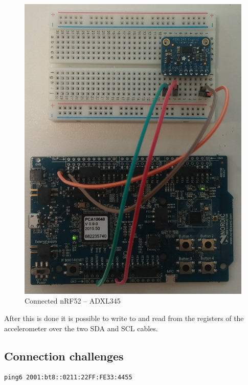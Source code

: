\begin{figure}[ht]
    \centering
    \includegraphics[scale=0.35]{nrf-adxl.png}    \caption{Connected nRF52 -- ADXL345}
    \label{fig:nrf-adxl345}
\end{figure}

After this is done it is possible to write to and read from the registers of the accelerometer over the two SDA and SCL cables. 


\subsection{Connection challenges}

\begin{verbatim}
ping6 2001:bt8::0211:22FF:FE33:4455
\end{verbatim}







